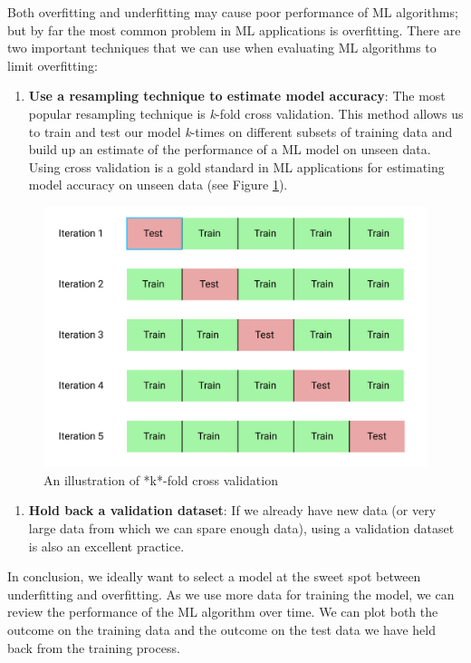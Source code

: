 \documentclass[]{book}
\providecommand{\tightlist}{%
  \setlength{\itemsep}{0pt}\setlength{\parskip}{0pt}}
\begin{document}
Both overfitting and underfitting may cause poor performance of ML algorithms; but by far the most common problem in ML applications is overfitting. There are two important techniques that we can use when evaluating ML algorithms to limit overfitting:

\begin{enumerate}
\def\labelenumi{\arabic{enumi}.}
\tightlist
\item
  \textbf{Use a resampling technique to estimate model accuracy}: The most popular resampling technique is \emph{k}-fold cross validation. This method allows us to train and test our model \emph{k}-times on different subsets of training data and build up an estimate of the performance of a ML model on unseen data. Using cross validation is a gold standard in ML applications for estimating model accuracy on unseen data (see Figure \ref{fig:fig5-4}).
\end{enumerate}

\begin{figure}
\includegraphics[width=1\linewidth]{images/k_fold} \caption{An illustration of *k*-fold cross validation}\label{fig:fig5-4}
\end{figure}

\begin{enumerate}
\def\labelenumi{\arabic{enumi}.}
\setcounter{enumi}{1}
\tightlist
\item
  \textbf{Hold back a validation dataset}: If we already have new data (or very large data from which we can spare enough data), using a validation dataset is also an excellent practice.
\end{enumerate}

In conclusion, we ideally want to select a model at the sweet spot between underfitting and overfitting. As we use more data for training the model, we can review the performance of the ML algorithm over time. We can plot both the outcome on the training data and the outcome on the test data we have held back from the training process.
\end{document}
